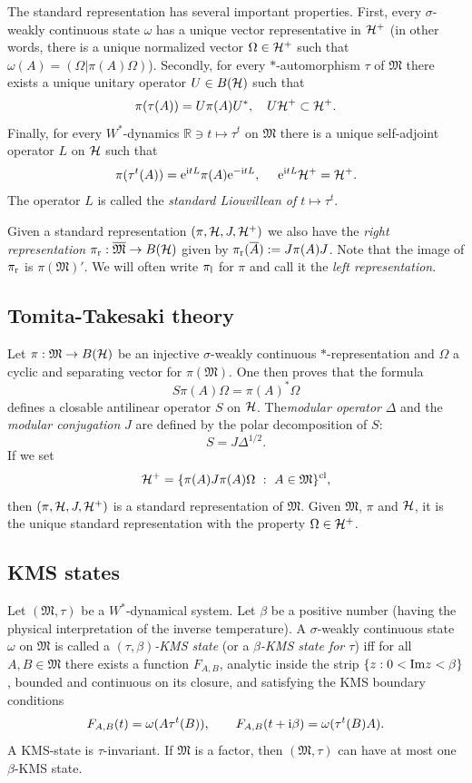 \documentclass{svmult}
\def\rr{{\mathbb R}}
\def\Im{{\rm Im}}
\def\cl{{\rm cl}}
\def\bar{\overline}
\def\l{{\rm l}}
\def\r{{\rm r}}
\def\fM{{\mathfrak M}}
\def\i{{\rm i}}
\def\e{{\rm e}}
\def\cH{{\cal H}}
\def\l{{\rm l}}
\def\r{{\rm r}}
\def\e{{\rm e}}
\def\cH{{\cal H}}
\begin{document}
The standard representation has several important properties.
First,  every $\sigma$-weakly continuous state $\omega$  has a unique 
vector representative  in $ \cH^+$ (in other words, there is a unique
normalized  vector $\Omega\in\cH^+$ such that
$\omega(A)=(\Omega|
\pi(A)\Omega)$). Secondly, for 
every 
$*$-automorphism $\tau$ of $\fM$ there exists a unique unitary operator
 $U\in B(\cH)$ such that \[\pi(\tau(A))=U\pi(A)U^*,\ \ \ 
U\cH^+\subset\cH^+.\]
Finally, for every $W^*$-dynamics 
$\rr\ni t\mapsto\tau^t$ on $\fM$ there is a unique self-adjoint operator $L$ 
on $\cH$ such that
\begin{equation}
\begin{split}
\pi(\tau^t(A))=\e^{\i tL}\pi(A)\e^{-\i tL},\ \ \ \ 
\e^{\i t L} \cH^+ =\cH^+.
\end{split}
\label{modrel}
\end{equation}
The operator $L$  is called
the {\em standard
 Liouvillean of  
 $t\mapsto\tau^t$}.


Given a standard representation $(\pi,\cH,J,\cH^+)$
we  also have
 the {\em right
representation} $\pi_\r:\bar\fM\to B(\cH)$ given by
$\pi_\r(\bar A):=J\pi(A)J$. Note that the image of $\pi_\r$ is $\pi(\fM)'$.
We  will often
 write $\pi_\l$ for $\pi$ and call it the {\em left representation}.

\subsection{Tomita-Takesaki theory}



Let $\pi:\fM\to B(\cH)$ be an injective
$\sigma$-weakly continuous $*$-representation 
and
$\Omega$  a cyclic and separating vector for $\pi(\fM)$. One then 
proves that the formula
\[S\pi(A)\Omega=\pi(A)^*
\Omega\] defines a closable antilinear operator $S$ on $\cH$.
The{\em  modular
 operator} $\Delta$ and the {\em modular conjugation } $J$ are defined by the
polar decomposition of $S$:
\[S=J\Delta^{1/2}.\]
If we set
\[\cH^+=\{\pi(A)J\pi(A)\Omega\ :\ A\in\fM\}^\cl,\]
then  $(\pi,\cH,J,\cH^+)$ is a standard representation of $\fM$. Given
$\fM$, $\pi$ and $\cH$, it is the unique standard
representation with the property
$\Omega\in\cH^+$.




\subsection{KMS states}

Let $(\fM,\tau)$ be a $W^*$-dynamical system. 
 Let $\beta$ be a positive number
(having the physical interpretation of  the inverse temperature).
  A $\sigma$-weakly continuous
state $\omega$ on  $\fM$
 is called a {\em $(\tau, \beta)$-KMS state} (or a {\em $\beta$-KMS
state for $\tau$}) 
iff for all $A, B \in \fM$ there 
exists a function $F_{A, B}$,  analytic inside the strip $\{ z : 0 < \Im z <\beta\}$,
 bounded and 
continuous on its closure, and satisfying the KMS boundary conditions
\[F_{A, B}(t)= \omega(A\tau^t(B)), \qquad F_{A, B}(t + \i \beta)= 
\omega(\tau^t(B)A).
\]
A KMS-state is $\tau$-invariant. If $\fM$ is a
factor, then $(\fM, \tau)$ can have at most one 
$\beta$-KMS state. 
 
\end{document}
